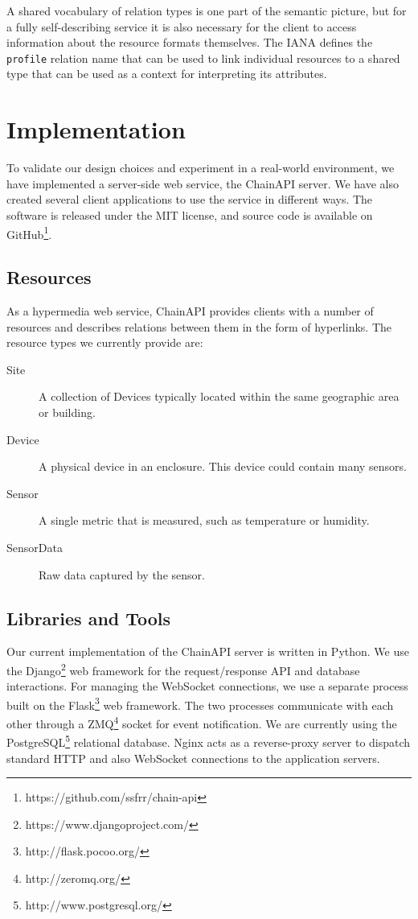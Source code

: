 \documentclass{acm_proc_article-sp}
\begin{document}
A shared vocabulary of relation types is one part of the semantic picture, but
for a fully self-describing service it is also necessary for the client to
access information about the resource formats themselves. The IANA defines the
\texttt{profile} relation name that can be used to link individual resources to
a shared type that can be used as a context for interpreting its attributes.

\section{Implementation}

To validate our design choices and experiment in a real-world environment, we
have implemented a server-side web service, the ChainAPI server. We have also
created several client applications to use the service in different ways.  The
software is released under the MIT license, and source code is available on
GitHub\footnote{https://github.com/ssfrr/chain-api}.

\subsection{Resources}
\label{api_resources}

As a hypermedia web service, ChainAPI provides clients with a number of
resources and describes relations between them in the form of hyperlinks.  The
resource types we currently provide are:

\begin{description}
    \item[Site] A collection of Devices typically located within the same
        geographic area or building.
    \item[Device] A physical device in an enclosure. This device could contain
        many sensors.
    \item[Sensor] A single metric that is measured, such as temperature or humidity.
    \item[SensorData] Raw data captured by the sensor.
\end{description}

\subsection{Libraries and Tools}

Our current implementation of the ChainAPI server is written in Python. We use
the Django\footnote{https://www.djangoproject.com/} web framework for the
request/response API and database interactions. For managing the WebSocket
connections, we use a separate process built on the
Flask\footnote{http://flask.pocoo.org/} web framework. The two processes
communicate with each other through a ZMQ\footnote{http://zeromq.org/} socket
for event notification. We are currently using the
PostgreSQL\footnote{http://www.postgresql.org/} relational database. Nginx acts
as a reverse-proxy server to dispatch standard HTTP and also WebSocket
connections to the application servers.
\end{document}
